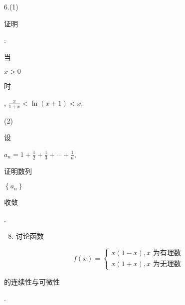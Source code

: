 \documentclass[10pt]{article}
\begin{document}
6.(1) \begin{CJK}{UTF8}{mj}证明\end{CJK}: \begin{CJK}{UTF8}{mj}当\end{CJK} $x>0$ \begin{CJK}{UTF8}{mj}时\end{CJK}, $\frac{x}{1+x}<\ln (x+1)<x$.

(2) \begin{CJK}{UTF8}{mj}设\end{CJK} $a_{n}=1+\frac{1}{2}+\frac{1}{3}+\cdots+\frac{1}{n}$, \begin{CJK}{UTF8}{mj}证明数列\end{CJK} $\left\{a_{n}\right\}$ \begin{CJK}{UTF8}{mj}收敛\end{CJK}.

\begin{enumerate}
  \setcounter{enumi}{7}
  \item \begin{CJK}{UTF8}{mj}讨论函数\end{CJK}
\end{enumerate}
$$
f(x)=\left\{\begin{array}{l}
x(1-x), x \text { 为有理数 } \\
x(1+x), x \text { 为无理数 }
\end{array}\right.
$$
\begin{CJK}{UTF8}{mj}的连续性与可微性\end{CJK}.
\end{document}
